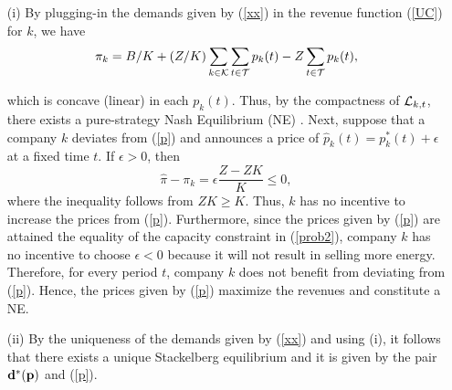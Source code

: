 \begin{itemize}
\item[(i)] By plugging-in the demands given by (\ref{xx}) in the revenue function (\ref{UC}) for $k$, we have 
$$\pi_k=B/K+(Z/K)\sum_{k\in {\cal K}}\sum_{t\in {\cal T}}p_k(t)-Z\sum_{t\in {\cal T}}p_k(t),$$

\noindent
which is concave (linear) in each $p_k(t)$. Thus, by the compactness of ${\cal L}_{k,t}$,  there exists a pure-strategy Nash Equilibrium (NE) \cite{basar}. Next, suppose that a company $k$ deviates from (\ref{p}) and announces a price of $\hat{p}_k(t)=p^*_k(t)+\epsilon$ at a fixed time $t$. If $\epsilon>0$, then
    $$\hat{\pi}-\pi_k=\epsilon  \frac{Z-ZK}{K} \leq 0,$$
    where the inequality follows from $ZK\geq K$. Thus, $k$ has no incentive to increase the prices from (\ref{p}). Furthermore, since the prices given by (\ref{p}) are attained the equality of the capacity constraint in (\ref{prob2}), company $k$ has no incentive to choose $\epsilon <0$ because it will not result in selling more energy. Therefore, for every period $t$, company $k$ does not benefit from deviating from (\ref{p}). Hence, the prices given by (\ref{p}) maximize the revenues and constitute a NE.


\item[(ii)] By the uniqueness of the demands given by (\ref{xx}) and using (i), it follows that there exists a unique Stackelberg equilibrium and it is given by the pair ${\bf{d^*(p)}}$ and (\ref{p}).%
\end{itemize}
